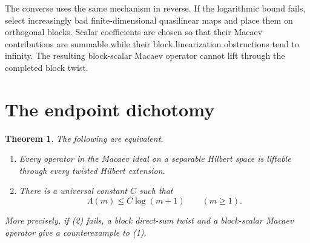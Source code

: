 \documentclass[11pt]{article}
\newtheorem{theorem}{Theorem}
\begin{document}
The converse uses the same mechanism in reverse. If the logarithmic bound
fails, select increasingly bad finite-dimensional quasilinear maps and place
them on orthogonal blocks. Scalar coefficients are chosen so that their
Macaev contributions are summable while their block linearization
obstructions tend to infinity. The resulting block-scalar Macaev operator
cannot lift through the completed block twist.

\section{The endpoint dichotomy}

\begin{theorem}\label{thm:main}
The following are equivalent.
\begin{enumerate}
\item Every operator in the Macaev ideal on a separable Hilbert space is
liftable through every twisted Hilbert extension.
\item There is a universal constant $C$ such that
\[
  \Lambda(m)\leq C\log(m+1)\qquad(m\geq1).
\]
\end{enumerate}
More precisely, if (2) fails, a block direct-sum twist and a block-scalar
Macaev operator give a counterexample to (1).
\end{theorem}
\end{document}
